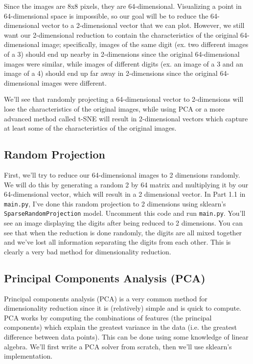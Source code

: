 \documentclass{article}
\begin{document}
Since the images are 8x8 pixels, they are 64-dimensional. Visualizing a point in 64-dimensional space is impossible, so our goal will be to reduce the 64-dimensional vector to a 2-dimensional vector that we can plot. However, we still want our 2-dimensional reduction to contain the characteristics of the original 64-dimensional image; specifically, images of the same digit (ex. two different images of a 3) should end up nearby in 2-dimensions since the original 64-dimensional images were similar, while images of different digits (ex. an image of a 3 and an image of a 4) should end up far away in 2-dimensions since the original 64-dimensional images were different.

We'll see that randomly projecting a 64-dimensional vector to 2-dimensions will lose the characteristics of the original images, while using PCA or a more advanced method called t-SNE will result in 2-dimensional vectors which capture at least some of the characteristics of the original images.

\subsection{Random Projection}

First, we'll try to reduce our 64-dimensional images to 2 dimensions randomly. We will do this by generating a random 2 by 64 matrix and multiplying it by our 64-dimensional vector, which will result in a 2 dimensional vector. In Part 1.1 in \texttt{main.py}, I've done this random projection to 2 dimensions using sklearn's \texttt{SparseRandomProjection} model. Uncomment this code and run \texttt{main.py}. You'll see an image displaying the digits after being reduced to 2 dimensions. You can see that when the reduction is done randomly, the digits are all mixed together and we've lost all information separating the digits from each other. This is clearly a very bad method for dimensionality reduction.

\subsection{Principal Components Analysis (PCA)}

Principal components analysis (PCA) is a very common method for dimensionality reduction since it is (relatively) simple and is quick to compute. PCA works by computing the combinations of features (the principal components) which explain the greatest variance in the data (i.e. the greatest difference between data points). This can be done using some knowledge of linear algebra. We'll first write a PCA solver from scratch, then we'll use sklearn's implementation.
\end{document}
